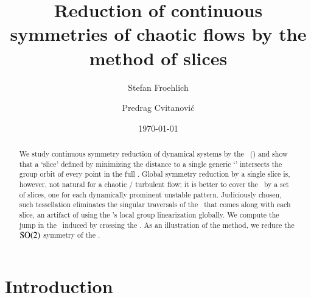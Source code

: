 \documentclass[preprint,12pt]{elsarticle} %
\begin{document}
\title{Reduction of continuous symmetries of chaotic flows
       by the method of slices}

\author{Stefan Froehlich}

\author{Predrag Cvitanovi\'{c}}

\address{Center for Nonlinear Science,
        School of Physics, Georgia Institute of Technology,
        Atlanta, GA 30332-0430}

\date{\today}

\begin{abstract}
We study continuous symmetry reduction of dynamical systems
by the \mslices\ (\mframes) and show that a `slice'
defined by minimizing the distance to a single generic `{\template}'
intersects the group orbit of every point in the full {\statesp}. Global
symmetry reduction by a single slice is, however, not natural for a
chaotic / turbulent flow; it is better to cover the \reducedsp\ by a set
of slices, one for each dynamically prominent unstable pattern.
Judiciously chosen, such tessellation eliminates the singular traversals
of the \sset\ that comes along with each slice, an artifact of using the
{\template}'s local group linearization globally. We compute the jump in
the \reducedsp\ induced by crossing the \sset. As an illustration of the
method, we reduce the $\textrm{SO}(2)$ symmetry of the \cLe.
\end{abstract}


\maketitle %

\section{Introduction}
    \label{sec:intro}
\end{document}
